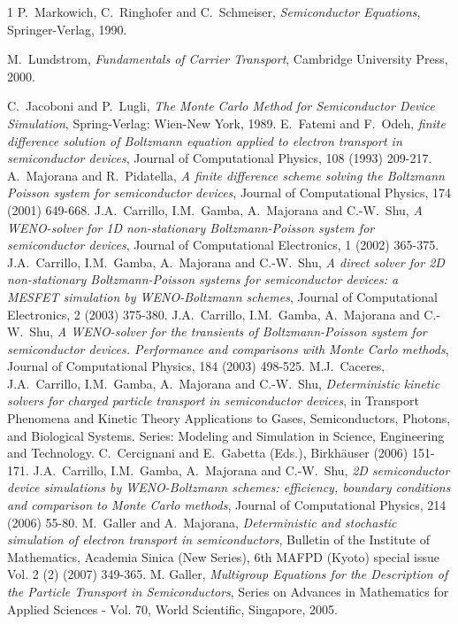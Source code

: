 \documentclass[11pt]{article}
\begin{document}
%
%
%
\begin{thebibliography}{1}
%
 P.~Markowich, C.~Ringhofer and C.~Schmeiser, 
\emph{Semiconductor Equations}, Springer-Verlag, 1990.

 M.~Lundstrom, 
\emph{Fundamentals of Carrier Transport}, Cambridge University Press, 2000.

%
{C.~Jacoboni and P.~Lugli}, 
{\em The Monte Carlo Method for Semiconductor Device Simulation}, 
Spring-Verlag: Wien-New York, 1989.
%
E.~Fatemi and F.~Odeh, 
\emph{finite difference solution of Boltzmann equation applied to electron transport in 
semiconductor devices}, 
Journal of Computational Physics, 108 (1993) 209-217.
%
A.~Majorana and R.~Pidatella, \emph{A finite difference scheme
solving the Boltzmann Poisson system for semiconductor devices},
Journal of Computational Physics, 174 (2001) 649-668.
%
J.A.~Carrillo, I.M.~Gamba, A.~Majorana and C.-W.~Shu, 
\emph{A WENO-solver for 1D non-stationary Boltzmann-Poisson system for semiconductor devices}, 
Journal of Computational Electronics, 1
(2002) 365-375.
%
J.A.~Carrillo, I.M.~Gamba, A.~Majorana and C.-W.~Shu, 
\emph{A direct solver for 2D non-stationary Boltzmann-Poisson systems for semiconductor devices: a 
MESFET simulation by WENO-Boltzmann schemes}, 
Journal of Computational Electronics, 2 (2003) 375-380.
%
J.A.~Carrillo, I.M.~Gamba, A.~Majorana and C.-W.~Shu,
\emph{A WENO-solver for the transients of Boltzmann-Poisson system
for semiconductor devices. Performance and compa\-risons with Monte Carlo methods}, 
Journal of Computational Physics, 184 (2003) 498-525.
%
M.J.~Caceres, J.A.~Carrillo, I.M.~Gamba, A.~Majorana and C.-W.~Shu,
\emph{Determini\-stic kinetic solvers for charged particle transport
in semiconductor devices}, in Transport Phenomena and Kinetic Theory
Applications to Gases, Semiconductors, Photons, and Biological Systems. 
Series: Modeling and Simulation in Science, Engineering and Technology.
C.~Cercignani and E.~Gabetta (Eds.), Birkh\"auser (2006) 151-171.
%
J.A.~Carrillo, I.M.~Gamba, A.~Majorana and C.-W.~Shu, 
\emph{2D semiconductor device simu\-lations by WENO-Boltzmann schemes:
efficiency, boundary conditions and comparison to Monte Carlo methods}, 
Journal of Computational Physics, 214 (2006) 55-80.
%
M.~Galler and A.~Majorana, 
\emph{Deterministic and stochastic simulation of electron transport in semiconductors},
Bulletin of the Institute of Mathematics, Academia Sinica (New
Series), 6th MAFPD (Kyoto) special issue Vol. 2 (2) (2007) 349-365.
%
M. Galler, 
\emph{ Multigroup Equations for the Description of the Particle Transport in Semiconductors}, Series on Advances in Mathematics for Applied Sciences - Vol. 70, World Scientific, Singapore, 2005.


\end{thebibliography}
\end{document}
